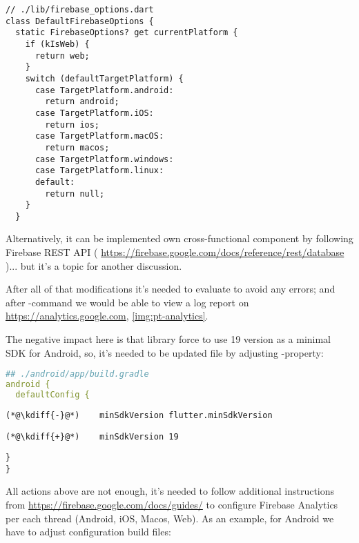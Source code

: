\begin{lstlisting}
// ./lib/firebase_options.dart
class DefaultFirebaseOptions {
  static FirebaseOptions? get currentPlatform {
    if (kIsWeb) {
      return web;
    }
    switch (defaultTargetPlatform) {
      case TargetPlatform.android:
        return android;
      case TargetPlatform.iOS:
        return ios;
      case TargetPlatform.macOS:
        return macos;
      case TargetPlatform.windows:
      case TargetPlatform.linux:
      default:
        return null;
    }
  }
\end{lstlisting}

Alternatively, it can be implemented own cross-functional component by following Firebase REST API (
\href{https://firebase.google.com/docs/reference/rest/database}{https://firebase.google.com/docs/reference/rest/database}
)... but it's a topic for another discussion.

After all of that modifications it's needed to evaluate  to avoid any errors; and after 
-command we would be able to view a log report on 
\href{https://analytics.google.com}{https://analytics.google.com}, \cref{img:pt-analytics}.


The negative impact here is that  library force to use 19 version as a minimal SDK for Android, 
so, it's needed to be updated  file by adjusting -property:

\begin{lstlisting}[language=yaml]
## ./android/app/build.gradle
android {
  defaultConfig {
\end{lstlisting}
{
\xpretocmd{\lstlisting}{\vspace{-12pt}}{}{}
\begin{lstlisting}[firstnumber=4, backgroundcolor=\color{backred}]
(*@\kdiff{-}@*)    minSdkVersion flutter.minSdkVersion
\end{lstlisting}
\begin{lstlisting}[firstnumber=4, backgroundcolor=\color{backgreen}]
(*@\kdiff{+}@*)    minSdkVersion 19
\end{lstlisting}
\begin{lstlisting}[firstnumber=5]
  }
}
\end{lstlisting}
}

All actions above are not enough, it's needed to follow additional instructions from  
\href{https://firebase.google.com/docs/guides/}{https://firebase.google.com/docs/guides/} to configure
Firebase Analytics per each thread (Android, iOS, Macos, Web). As an example, for Android we have to adjust
configuration build files:

